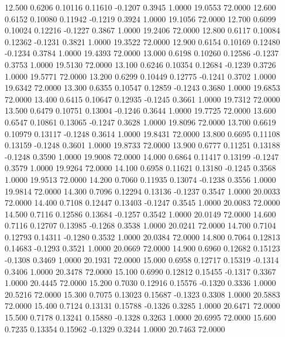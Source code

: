   12.500   0.6206   0.10116   0.11610  -0.1207   0.3945   1.0000  19.0553  72.0000
  12.600   0.6152   0.10080   0.11942  -0.1219   0.3924   1.0000  19.1056  72.0000
  12.700   0.6099   0.10024   0.12216  -0.1227   0.3867   1.0000  19.2406  72.0000
  12.800   0.6117   0.10084   0.12362  -0.1231   0.3821   1.0000  19.3522  72.0000
  12.900   0.6154   0.10169   0.12480  -0.1234   0.3784   1.0000  19.4393  72.0000
  13.000   0.6198   0.10260   0.12586  -0.1237   0.3753   1.0000  19.5130  72.0000
  13.100   0.6246   0.10354   0.12684  -0.1239   0.3726   1.0000  19.5771  72.0000
  13.200   0.6299   0.10449   0.12775  -0.1241   0.3702   1.0000  19.6342  72.0000
  13.300   0.6355   0.10547   0.12859  -0.1243   0.3680   1.0000  19.6853  72.0000
  13.400   0.6415   0.10647   0.12935  -0.1245   0.3661   1.0000  19.7312  72.0000
  13.500   0.6479   0.10751   0.13004  -0.1246   0.3644   1.0000  19.7725  72.0000
  13.600   0.6547   0.10861   0.13065  -0.1247   0.3628   1.0000  19.8096  72.0000
  13.700   0.6619   0.10979   0.13117  -0.1248   0.3614   1.0000  19.8431  72.0000
  13.800   0.6695   0.11108   0.13159  -0.1248   0.3601   1.0000  19.8733  72.0000
  13.900   0.6777   0.11251   0.13188  -0.1248   0.3590   1.0000  19.9008  72.0000
  14.000   0.6864   0.11417   0.13199  -0.1247   0.3579   1.0000  19.9264  72.0000
  14.100   0.6958   0.11621   0.13180  -0.1245   0.3568   1.0000  19.9513  72.0000
  14.200   0.7060   0.11935   0.13074  -0.1238   0.3556   1.0000  19.9814  72.0000
  14.300   0.7096   0.12294   0.13136  -0.1237   0.3547   1.0000  20.0033  72.0000
  14.400   0.7108   0.12447   0.13403  -0.1247   0.3545   1.0000  20.0083  72.0000
  14.500   0.7116   0.12586   0.13684  -0.1257   0.3542   1.0000  20.0149  72.0000
  14.600   0.7116   0.12707   0.13985  -0.1268   0.3538   1.0000  20.0241  72.0000
  14.700   0.7104   0.12793   0.14311  -0.1280   0.3532   1.0000  20.0384  72.0000
  14.800   0.7064   0.12813   0.14683  -0.1293   0.3521   1.0000  20.0669  72.0000
  14.900   0.6960   0.12682   0.15123  -0.1308   0.3469   1.0000  20.1931  72.0000
  15.000   0.6958   0.12717   0.15319  -0.1314   0.3406   1.0000  20.3478  72.0000
  15.100   0.6990   0.12812   0.15455  -0.1317   0.3367   1.0000  20.4445  72.0000
  15.200   0.7030   0.12916   0.15576  -0.1320   0.3336   1.0000  20.5216  72.0000
  15.300   0.7075   0.13023   0.15687  -0.1323   0.3308   1.0000  20.5883  72.0000
  15.400   0.7124   0.13131   0.15788  -0.1326   0.3285   1.0000  20.6471  72.0000
  15.500   0.7178   0.13241   0.15880  -0.1328   0.3263   1.0000  20.6995  72.0000
  15.600   0.7235   0.13354   0.15962  -0.1329   0.3244   1.0000  20.7463  72.0000
